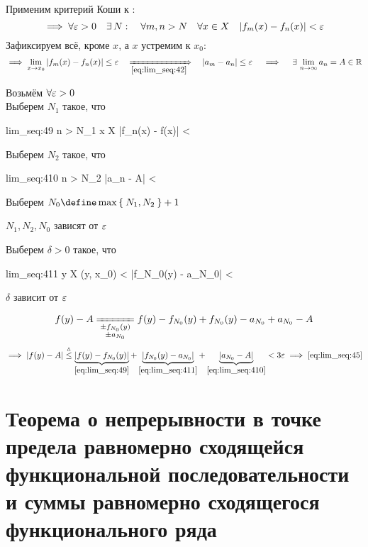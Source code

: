 \begin{iproof}
	\item {}

	Применим критерий Коши к :
	$$ \implies \forall \varepsilon > 0 \quad \exists\, N : \quad \forall m, n > N \quad \forall x \in X \quad |f_m(x) - f_n(x)| < \varepsilon $$
	Зафиксируем всё, кроме $ x $, а $ x $ устремим к $ x_0 $:
	$$ \implies \liml{x \to x_0} |f_m(x) - f_n(x)| \le \veps \quad \underimp{\eref{lim_seq:42}} \quad |a_m - a_n| \le \veps \quad \implies \quad \exist \limi{n} a_n = A \in \R $$

	\item {}

	Возьмём $ \forall \varepsilon > 0 $ \\
	Выберем $ N_1 $ такое, что
	\begin{equ}{lim_seq:49}
		\forall n > N_1 \quad \forall x \in X \setminus {} \quad |f_n(x) - f(x)| < \veps
	\end{equ}
	Выберем $ N_2 $ такое, что
	\begin{equ}{lim_seq:410}
		\forall n > N_2 \quad |a_n - A| < \veps
	\end{equ}
	Выберем $ N_0 \define \max\set{N_1, N_2} + 1 $
	\begin{remark}
		$ N_1, N_2, N_0 $ зависят от $ \varepsilon $
	\end{remark}
	Выберем $ \delta > 0 $ такое, что
	\begin{equ}{lim_seq:411}
		\forall y \in X \setminus {} \quad \nimp[\bigg(] \diam(y, x_0) < \delta \implies |f_{N_0}(y) - a_{N_0}| < \veps \nimp[\bigg)]
	\end{equ}
	\begin{remark}
		$ \delta $ зависит  от $ \varepsilon $
	\end{remark}
	$$ f(y) - A \undereq{
		\begin{subarray}{c}
			\pm f_{N_0}(y) \\
			\pm a_{N_0}
		\end{subarray}} f(y) - f_{N_0}(y) + f_{N_0}(y) - a_{N_0} + a_{N_0} - A $$
	$$ \implies |f(y) - A| \trile \underbrace{|f(y) - f_{N_0}(y)|}_{\eref{lim_seq:49}} + \underbrace{|f_{N_0}(y) - a_{N_0}|}_{\eref{lim_seq:411}} + \underbrace{|a_{N_0} - A|}_{\eref{lim_seq:410}} < 3\veps \implies \eref{lim_seq:45} $$
\end{iproof}

\section{Теорема о непрерывности в точке предела равномерно сходящейся функциональной последовательности и суммы равномерно сходящегося функционального ряда}

